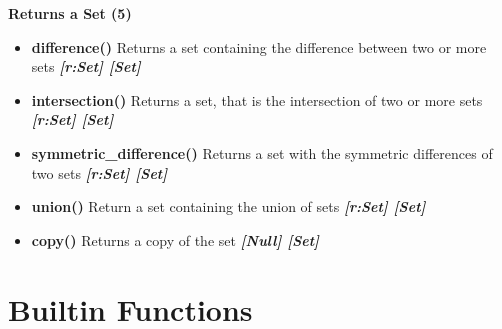 \documentclass{report}
\begin{document}
    \bigbreak \noindent 
    
      \begin{center}
        \textbf{Returns a Set (5)}
      \end{center}
      \begin{itemize}
        \item[\ding{43}] \textbf{difference()}	Returns a set containing the difference between two or more sets
          \smallbreak \noindent
          \textbf{\textit{[r:Set] [Set]}}
          \smallbreak \noindent
        \item[\ding{43}] \textbf{intersection()}	Returns a set, that is the intersection of two or more sets
          \smallbreak \noindent
          \textbf{\textit{[r:Set] [Set]}}
          \smallbreak \noindent
        \item[\ding{43}] \textbf{symmetric\_difference()}	Returns a set with the symmetric differences of two sets
          \smallbreak \noindent
          \textbf{\textit{[r:Set] [Set]}}
        \item[\ding{43}] \textbf{union()}	Return a set containing the union of sets
          \smallbreak \noindent
          \textbf{\textit{[r:Set] [Set]}}
          \smallbreak \noindent
        \item[\ding{43}] \textbf{copy()}	Returns a copy of the set
          \smallbreak \noindent
          \textbf{\textit{[Null] [Set]}}
          \smallbreak \noindent
      \end{itemize}
    



    \pagebreak \bigbreak \noindent 
    \section{\LARGE Builtin Functions}
    \bigbreak \noindent 
    
\end{document}

